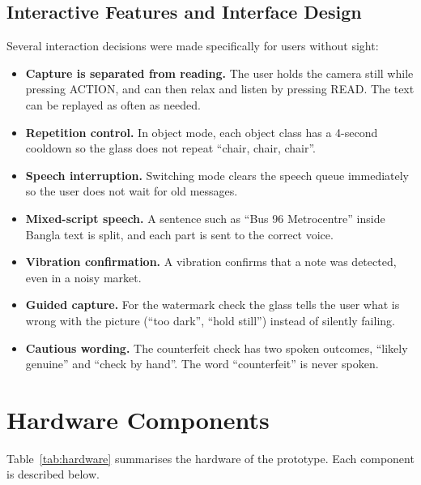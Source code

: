 \subsection{Interactive Features and Interface Design}
Several interaction decisions were made specifically for users without sight:
\begin{itemize}[noitemsep]
    \item \textbf{Capture is separated from reading.} The user holds the camera still while pressing ACTION, and can then relax and listen by pressing READ. The text can be replayed as often as needed.
    \item \textbf{Repetition control.} In object mode, each object class has a 4-second cooldown so the glass does not repeat ``chair, chair, chair''.
    \item \textbf{Speech interruption.} Switching mode clears the speech queue immediately so the user does not wait for old messages.
    \item \textbf{Mixed-script speech.} A sentence such as ``Bus 96 Metrocentre'' inside Bangla text is split, and each part is sent to the correct voice.
    \item \textbf{Vibration confirmation.} A vibration confirms that a note was detected, even in a noisy market.
    \item \textbf{Guided capture.} For the watermark check the glass tells the user what is wrong with the picture (``too dark'', ``hold still'') instead of silently failing.
    \item \textbf{Cautious wording.} The counterfeit check has two spoken outcomes, ``likely genuine'' and ``check by hand''. The word ``counterfeit'' is never spoken.
\end{itemize}


\section{Hardware Components}
\label{sec:hardware}

Table~\ref{tab:hardware} summarises the hardware of the prototype. Each component is described below.

